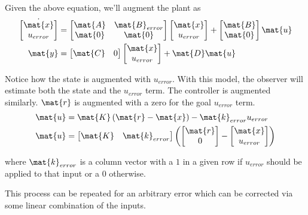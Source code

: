 Given the above equation, we'll augment the \gls{plant} as
\begin{align*}
  \dot{\begin{bmatrix}
    \mat{x} \\
    u_{error}
  \end{bmatrix}} &=
  \begin{bmatrix}
    \mat{A} & \mat{B}_{error} \\
    \mat{0} & \mat{0}
  \end{bmatrix}
  \begin{bmatrix}
    \mat{x} \\
    u_{error}
  \end{bmatrix} +
  \begin{bmatrix}
    \mat{B} \\
    \mat{0}
  \end{bmatrix}
  \mat{u} \\
  \mat{y} &= \begin{bmatrix}
    \mat{C} & 0
  \end{bmatrix} \begin{bmatrix}
    \mat{x} \\
    u_{error}
  \end{bmatrix} + \mat{D}\mat{u}
\end{align*}

Notice how the \gls{state} is augmented with $u_{error}$. With this \gls{model},
the \gls{observer} will estimate both the \gls{state} and the $u_{error}$ term.
The controller is augmented similarly. $\mat{r}$ is augmented with a zero for
the goal $u_{error}$ term.
\begin{align*}
  \mat{u} &= \mat{K} \left(\mat{r} - \mat{x}\right) - \mat{k}_{error}u_{error}
    \\
  \mat{u} &=
  \begin{bmatrix}
    \mat{K} & \mat{k}_{error}
  \end{bmatrix}
  \left(\begin{bmatrix}
    \mat{r} \\
    0
  \end{bmatrix} -
  \begin{bmatrix}
    \mat{x} \\
    u_{error}
  \end{bmatrix}\right)
\end{align*}

where $\mat{k}_{error}$ is a column vector with a $1$ in a given row if
$u_{error}$ should be applied to that \gls{input} or a $0$ otherwise.

This process can be repeated for an arbitrary \gls{error} which can be corrected
via some linear combination of the \glspl{input}.

